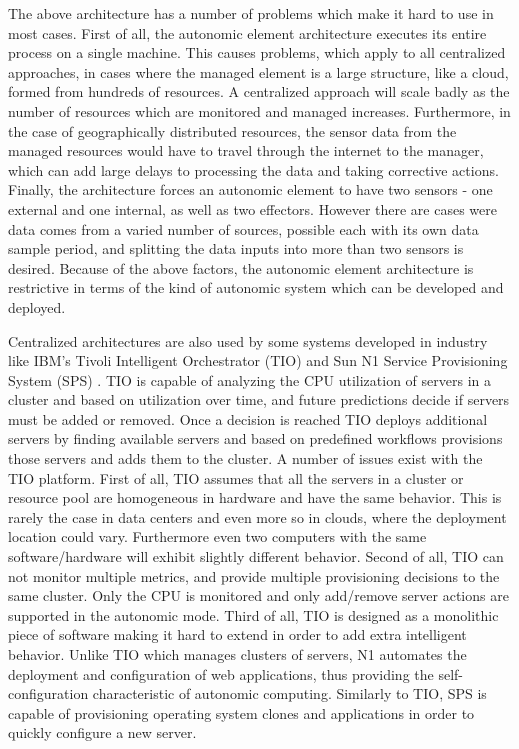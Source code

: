 The above architecture has a number of problems which make it hard to use in most cases. First of all, the autonomic element architecture executes its entire process on a single machine. This causes problems, which apply to all centralized approaches, in cases where the managed element is a large structure, like a cloud, formed from hundreds of resources. A centralized approach will scale badly as the number of resources which are monitored and managed increases. Furthermore, in the case of geographically distributed resources, the sensor data from the managed resources would have to travel through the internet to the manager, which can add large delays to processing the data and taking corrective actions. Finally, the architecture forces an autonomic element to have two sensors - one external and one internal, as well as two effectors. However there are cases were data comes from a varied number of sources, possible each with its own data sample period, and splitting the data inputs into more than two sensors is desired. Because of the above factors, the autonomic element architecture is restrictive in terms of the kind of autonomic system which can be developed and deployed.

Centralized architectures are also used by some systems developed in industry like IBM's Tivoli Intelligent Orchestrator (TIO) \cite{product:tio} and Sun N1 Service Provisioning System (SPS) \cite{product:n1}. TIO is capable of analyzing the CPU utilization of servers in a cluster and based on utilization over time, and future predictions decide if servers must be added or removed. Once a decision is reached TIO deploys additional servers by finding available servers and based on predefined workflows provisions those servers and adds them to the cluster. A number of issues exist with the TIO platform. First of all, TIO assumes that all the servers in a cluster or resource pool are homogeneous in hardware and have the same behavior. This is rarely the case in data centers and even more so in clouds, where the deployment location could vary. Furthermore even two computers with the same software/hardware will exhibit slightly different behavior. Second of all, TIO can not monitor multiple metrics, and provide multiple provisioning decisions to the same cluster. Only the CPU is monitored and only add/remove server actions are supported in the autonomic mode. Third of all, TIO is designed as a monolithic piece of software making it hard to extend in order to add extra intelligent behavior. Unlike TIO which manages clusters of servers, N1 automates the deployment and configuration of web applications, thus providing the self-configuration characteristic of autonomic computing. Similarly to TIO, SPS is capable of provisioning operating system clones and applications in order to quickly configure a new server.

